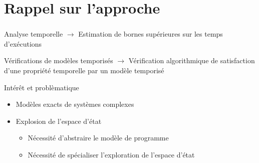 \documentclass{beamer}
\begin{document}
  \section{Rappel sur l'approche}
  \begin{frame}
    \frametitle{\secname}
    
    \begin{block}{Analyse temporelle}
      $\rightarrow$ Estimation de bornes supérieures sur les temps d'exécutions
    \end{block}

    \vfill

    
    \begin{block}{Vérifications de modèles temporisés}
      $\rightarrow$ Vérification algorithmique de satisfaction d'une propriété
      temporelle par un modèle temporisé
    \end{block}
    
    \vfill        
    \begin{block}{Intérêt et problèmatique}
      \begin{itemize}
        \item Modèles exacts de systèmes complexes
        \item \alert{Explosion de l'espace d'état}
          \begin{itemize}
            \item Nécessité d'abstraire le modèle de programme
            \item Nécessité de spécialiser l'exploration de  l'espace d'état
          \end{itemize}
      \end{itemize}
    \end{block}
  \end{frame}
\end{document}
